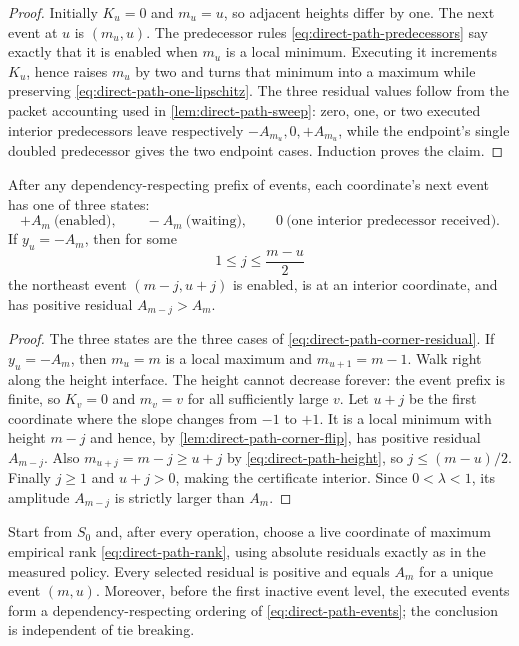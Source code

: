 \begin{proof}
Initially $K_u=0$ and $m_u=u$, so adjacent heights differ by one. The next
event at $u$ is $(m_u,u)$. The predecessor rules
\cref{eq:direct-path-predecessors} say exactly that it is enabled when $m_u$
is a local minimum. Executing it increments $K_u$, hence raises $m_u$ by
two and turns that minimum into a maximum while preserving
\cref{eq:direct-path-one-lipschitz}. The three residual values follow from
the packet accounting used in \cref{lem:direct-path-sweep}: zero, one, or two
executed interior predecessors leave respectively
$-A_{m_u},0,+A_{m_u}$, while the endpoint's single doubled predecessor gives
the two endpoint cases. Induction proves the claim.
\end{proof}

\begin{lemma}
\label{lem:direct-path-positive-certificate}
After any dependency-respecting prefix of events, each coordinate's next
event has one of three states:
\begin{equation}
 +A_m\ \text{(enabled)},\qquad
 -A_m\ \text{(waiting)},\qquad
 0\ \text{(one interior predecessor received)}.
 \label{eq:direct-path-three-states}
\end{equation}
If $y_u=-A_m$, then for some
\begin{equation*}
 1\leq j\leq\frac{m-u}{2}
\end{equation*}
the northeast event $(m-j,u+j)$ is enabled, is at an interior coordinate,
and has positive residual $A_{m-j}>A_m$.
\end{lemma}

\begin{proof}
The three states are the three cases of
\cref{eq:direct-path-corner-residual}. If $y_u=-A_m$, then $m_u=m$ is a local
maximum and $m_{u+1}=m-1$. Walk right along the height interface. The height
cannot decrease forever: the event prefix is finite, so $K_v=0$ and $m_v=v$
for all sufficiently large $v$. Let $u+j$ be the first coordinate where the
slope changes from $-1$ to $+1$. It is a local minimum with height $m-j$ and
hence, by \cref{lem:direct-path-corner-flip}, has positive residual
$A_{m-j}$. Also $m_{u+j}=m-j\geq u+j$ by
\cref{eq:direct-path-height}, so $j\leq(m-u)/2$. Finally $j\geq1$ and
$u+j>0$, making the certificate interior. Since $0<\lambda<1$, its amplitude
$A_{m-j}$ is strictly larger than $A_m$.
\end{proof}

\begin{lemma}
\label{lem:direct-path-ranked-events}
Start from $S_0$ and, after every operation, choose a live coordinate of
maximum empirical rank \cref{eq:direct-path-rank}, using absolute residuals
exactly as in the measured policy. Every selected residual is positive and
equals $A_m$ for a unique event $(m,u)$. Moreover, before the first inactive
event level, the executed events form a dependency-respecting ordering of
\cref{eq:direct-path-events}; the conclusion is independent of tie breaking.
\end{lemma}

